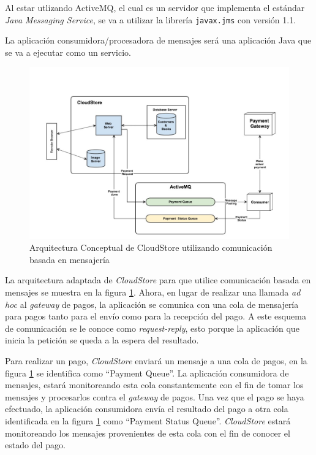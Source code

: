 \documentclass[article]{IEEEtran}
\begin{document}
Al estar utlizando ActiveMQ, el cual es un servidor que implementa el estándar \emph{Java Messaging Service}, se va a utilizar la librería \texttt{javax.jms} con versión 1.1.

La aplicación consumidora/procesadora de mensajes será una aplicación Java que se va a ejecutar como un servicio. 

\begin{figure}[h]
  \centering
  \includegraphics[width=14cm]{cloudstore-jms}
  \caption{\small{Arquitectura Conceptual de CloudStore utilizando comunicación basada en mensajería}}
  \label{fig:cloudstore-jms}
\end{figure}

La arquitectura adaptada de \emph{CloudStore} para que utilice comunicación basada en mensajes se muestra en la figura \ref{fig:cloudstore-jms}. Ahora, en lugar de realizar una llamada \emph{ad hoc} al \emph{gateway} de pagos, la aplicación se comunica con una cola de mensajería para pagos tanto para el envío como para la recepción del pago. A este esquema de comunicación se le conoce como \emph{request-reply}, esto porque la aplicación que inicia la petición se queda a la espera del resultado.

Para realizar un pago, \emph{CloudStore} enviará un mensaje a una cola de pagos, en la figura \ref{fig:cloudstore-jms} se identifica como ``Payment Queue''. La aplicación consumidora de mensajes, estará monitoreando esta cola constantemente con el fin de tomar los mensajes y procesarlos contra el \emph{gateway} de pagos. Una vez que el pago se haya efectuado, la aplicación consumidora envía el resultado del pago a otra cola identificada en la figura \ref{fig:cloudstore-jms} como ``Payment Status Queue''. \emph{CloudStore} estará monitoreando los mensajes provenientes de esta cola con el fin de conocer el estado del pago.
\end{document}

